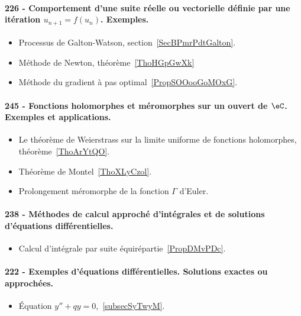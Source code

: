 \paragraph{226 - Comportement d’une suite réelle ou vectorielle définie par une itération \( u_{n+1}=f(u_n)\). Exemples.}
\begin{itemize}
    \item Processus de Galton-Watson, section~\ref{SecBPmrPdtGalton}.
    \item Méthode de Newton, théorème~\ref{ThoHGpGwXk}
    \item Méthode du gradient à pas optimal~\ref{PropSOOooGoMOxG}.
\end{itemize}
\paragraph{245 - Fonctions holomorphes et méromorphes sur un ouvert de \( \eC\). Exemples et applications.}
\begin{itemize}
    \item Le théorème de Weierstrass sur la limite uniforme de fonctions holomorphes, théorème~\ref{ThoArYtQO}.
    \item Théorème de Montel~\ref{ThoXLyCzol}.
    \item Prolongement méromorphe de la fonction \( \Gamma\) d'Euler.
\end{itemize}
\paragraph{238 - Méthodes de calcul approché d'intégrales et de solutions d’équations différentielles.}
\begin{itemize}
    \item Calcul d'intégrale par suite équirépartie~\ref{PropDMvPDc}.
\end{itemize}
\paragraph{222 - Exemples d’équations différentielles. Solutions exactes ou approchées.}
\begin{itemize}
    \item Équation \( y''+qy=0\),~\ref{subsecSyTwyM}.
\end{itemize}
